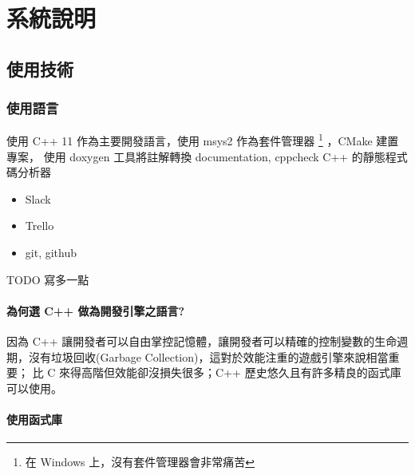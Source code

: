 \chapter{系統說明}

\section{使用技術}

\subsection{使用語言}

使用 C++ 11 作為主要開發語言，使用 msys2 作為套件管理器 \footnote{在 Windows 上，沒有套件管理器會非常痛苦} ，CMake 建置專案，
使用 doxygen 工具將註解轉換 documentation, cppcheck C++ 的靜態程式碼分析器

\begin{itemize}
	\item{Slack}
	\item{Trello}
	\item{git, github}
\end{itemize}

TODO 寫多一點

\subsubsection{為何選 C++ 做為開發引擎之語言?}

因為 C++ 讓開發者可以自由掌控記憶體，讓開發者可以精確的控制變數的生命週期，沒有垃圾回收(Garbage Collection)，這對於效能注重的遊戲引擎來說相當重要；
比 C 來得高階但效能卻沒損失很多；C++ 歷史悠久且有許多精良的函式庫可以使用。 \cite{WhyCppUsedInGameEngine}

\subsubsection{使用函式庫}

